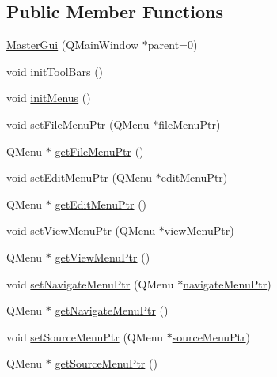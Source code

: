 \subsection*{Public Member Functions}
\begin{DoxyCompactItemize}
\item 
\hyperlink{class_master_gui_a9d3221a5d6791ffab353e038452e8b79}{Master\-Gui} (Q\-Main\-Window $\ast$parent=0)
\item 
void \hyperlink{class_master_gui_aa8cb5efc03f304d4a80d0d743a30e5b3}{init\-Tool\-Bars} ()
\item 
void \hyperlink{class_master_gui_a65f7212a54b92bdd21498478b9689631}{init\-Menus} ()
\item 
void \hyperlink{class_master_gui_a4ee6b41a4beb5adfd5c2c15e2490384e}{set\-File\-Menu\-Ptr} (Q\-Menu $\ast$\hyperlink{class_master_gui_a1d768ad74ddb657928df8539c356abb6}{file\-Menu\-Ptr})
\item 
Q\-Menu $\ast$ \hyperlink{class_master_gui_a91a38d0a69249c1f2d6a6175e9fb5342}{get\-File\-Menu\-Ptr} ()
\item 
void \hyperlink{class_master_gui_a91cccfac6fdcd723b4d127a0a668adc7}{set\-Edit\-Menu\-Ptr} (Q\-Menu $\ast$\hyperlink{class_master_gui_aeb708f257518fb47d567d1130bfc7f7f}{edit\-Menu\-Ptr})
\item 
Q\-Menu $\ast$ \hyperlink{class_master_gui_a50196fb1473d723bc940c54879ef6388}{get\-Edit\-Menu\-Ptr} ()
\item 
void \hyperlink{class_master_gui_a4a18f80bfecff6ff5bae16721044dcac}{set\-View\-Menu\-Ptr} (Q\-Menu $\ast$\hyperlink{class_master_gui_acb6a42ddb59a05f60ab7aa2a9fdddbc8}{view\-Menu\-Ptr})
\item 
Q\-Menu $\ast$ \hyperlink{class_master_gui_a3fb03d1a102443e480594a5823917e1a}{get\-View\-Menu\-Ptr} ()
\item 
void \hyperlink{class_master_gui_a2479e3fe7c83858e517855dededf2c51}{set\-Navigate\-Menu\-Ptr} (Q\-Menu $\ast$\hyperlink{class_master_gui_aec75bd894b1c0eecea35c67ecdfcf1b0}{navigate\-Menu\-Ptr})
\item 
Q\-Menu $\ast$ \hyperlink{class_master_gui_a72fd20d98b2d2754fe37beb40e4f5bc6}{get\-Navigate\-Menu\-Ptr} ()
\item 
void \hyperlink{class_master_gui_a58264652e48e97b3313819f0f67bb19e}{set\-Source\-Menu\-Ptr} (Q\-Menu $\ast$\hyperlink{class_master_gui_a3ffd8337f87c7c6eca6b4740fa8d1c57}{source\-Menu\-Ptr})
\item 
Q\-Menu $\ast$ \hyperlink{class_master_gui_ab3b214293b67475e58c899a0683c4b52}{get\-Source\-Menu\-Ptr} ()

\end{DoxyCompactItemize}
